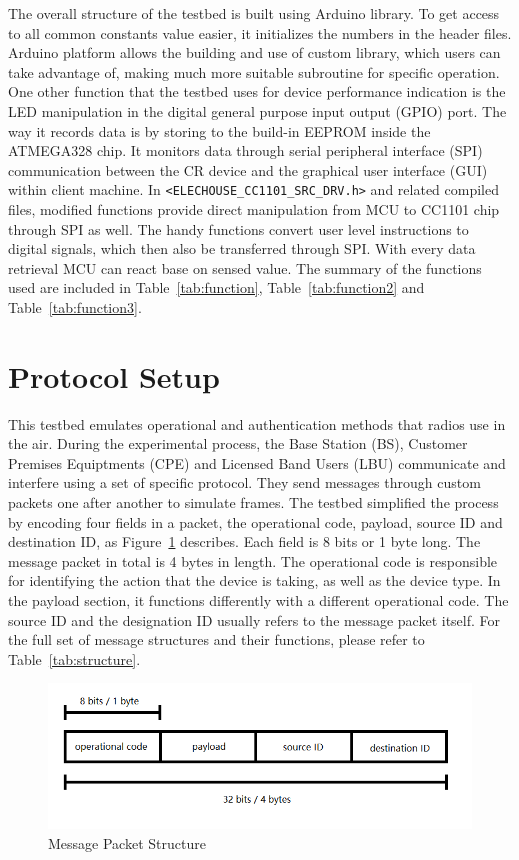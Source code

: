 The overall structure of the testbed is built using Arduino library. To get access to all common constants value easier, 
it initializes the numbers in the header files. Arduino platform allows the building and use of custom library, which users can take advantage
of, making much more suitable subroutine for specific operation. One other function that the testbed uses for device performance indication 
is the LED manipulation in the digital general purpose input output (GPIO) port. The way it records data is by storing to the build-in
EEPROM inside the ATMEGA328 chip. It monitors data through 
serial peripheral interface (SPI) communication between the CR device and the graphical user interface (GUI) within client machine.
In \texttt{<ELECHOUSE\_CC1101\_SRC\_DRV.h>} and related compiled files, modified functions provide direct manipulation from MCU 
to CC1101 chip through SPI as well. The handy functions convert user level instructions to digital signals, which then also be transferred 
through SPI. With every data retrieval MCU can react base on sensed value. The summary of the functions used are included in
Table~\ref{tab:function}, Table~\ref{tab:function2} and Table~\ref{tab:function3}.

\section{Protocol Setup}

This testbed emulates operational and authentication methods that radios use in the air. During the experimental process, 
the Base Station (BS), Customer Premises Equiptments (CPE) and Licensed Band Users (LBU) communicate and interfere using 
a set of specific protocol. They send messages through custom packets one after another to simulate frames. The testbed simplified 
the process by encoding four fields in a packet, the operational code, payload, source ID and destination ID, as Figure~\ref{fig:packet} describes. 
Each field is 8 bits or 1 byte long. The message packet in total is 4 bytes in length. The operational code is responsible for identifying the 
action that the device is taking, as well as the device type. In the payload section, it functions differently with a different operational code.
The source ID and the designation ID usually refers to the message packet itself. For the full set of message structures and their functions, 
please refer to Table~\ref{tab:structure}.

\begin{figure}[ht]
\centering
\includegraphics[width=12cm]{figures/packet.png}
\caption{Message Packet Structure}
\label{fig:packet}
\end{figure}


